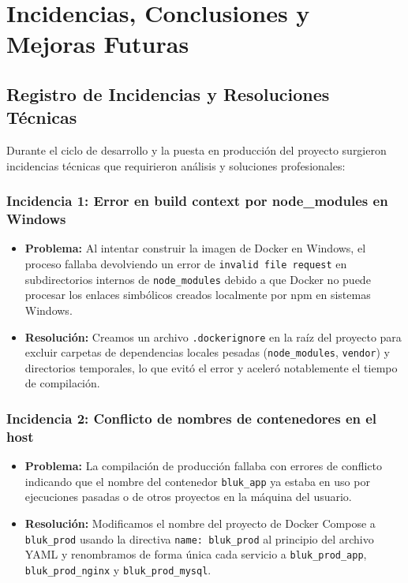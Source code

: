 \chapter{Incidencias, Conclusiones y Mejoras Futuras}

\section{Registro de Incidencias y Resoluciones Técnicas}
Durante el ciclo de desarrollo y la puesta en producción del proyecto surgieron incidencias técnicas que requirieron análisis y soluciones profesionales:

\subsection{Incidencia 1: Error en build context por node\_modules en Windows}
\begin{itemize}
    \item \textbf{Problema:} Al intentar construir la imagen de Docker en Windows, el proceso fallaba devolviendo un error de \texttt{invalid file request} en subdirectorios internos de \texttt{node\_modules} debido a que Docker no puede procesar los enlaces simbólicos creados localmente por npm en sistemas Windows.
    \item \textbf{Resolución:} Creamos un archivo \texttt{.dockerignore} en la raíz del proyecto para excluir carpetas de dependencias locales pesadas (\texttt{node\_modules}, \texttt{vendor}) y directorios temporales, lo que evitó el error y aceleró notablemente el tiempo de compilación.
\end{itemize}

\subsection{Incidencia 2: Conflicto de nombres de contenedores en el host}
\begin{itemize}
    \item \textbf{Problema:} La compilación de producción fallaba con errores de conflicto indicando que el nombre del contenedor \texttt{bluk\_app} ya estaba en uso por ejecuciones pasadas o de otros proyectos en la máquina del usuario.
    \item \textbf{Resolución:} Modificamos el nombre del proyecto de Docker Compose a \texttt{bluk\_prod} usando la directiva \texttt{name: bluk\_prod} al principio del archivo YAML y renombramos de forma única cada servicio a \texttt{bluk\_prod\_app}, \texttt{bluk\_prod\_nginx} y \texttt{bluk\_prod\_mysql}.
\end{itemize}

